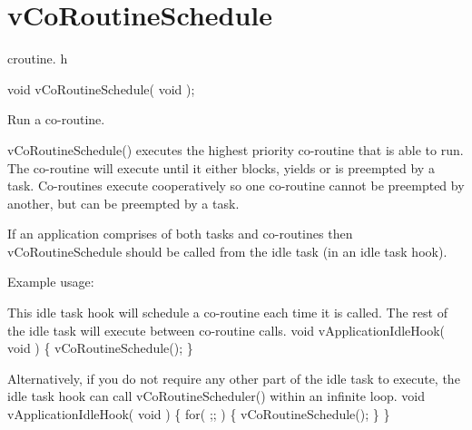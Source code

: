 \hypertarget{group__v_co_routine_schedule}{\section{v\-Co\-Routine\-Schedule}
\label{group__v_co_routine_schedule}
}
croutine. h 
\begin{DoxyPre}
 void vCoRoutineSchedule( void );\end{DoxyPre}


Run a co-\/routine.

v\-Co\-Routine\-Schedule() executes the highest priority co-\/routine that is able to run. The co-\/routine will execute until it either blocks, yields or is preempted by a task. Co-\/routines execute cooperatively so one co-\/routine cannot be preempted by another, but can be preempted by a task.

If an application comprises of both tasks and co-\/routines then v\-Co\-Routine\-Schedule should be called from the idle task (in an idle task hook).

Example usage\-: 
\begin{DoxyPre}
This idle task hook will schedule a co-routine each time it is called.
The rest of the idle task will execute between co-routine calls.
 void vApplicationIdleHook( void )
 \{
        vCoRoutineSchedule();
 \}\end{DoxyPre}



\begin{DoxyPre}Alternatively, if you do not require any other part of the idle task to
execute, the idle task hook can call vCoRoutineScheduler() within an
infinite loop.
 void vApplicationIdleHook( void )
 \{
    for( ;; )
    \{
        vCoRoutineSchedule();
    \}
 \}
 \end{DoxyPre}
 
